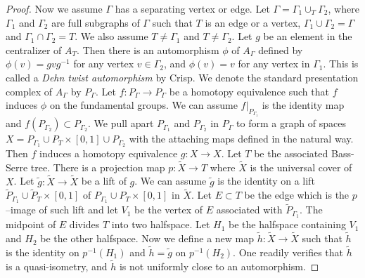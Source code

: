 \documentclass[11pt]{amsart}
\theoremstyle{definition}
\begin{document}
\begin{proof}
Now we assume $\Gamma$ has a separating vertex or edge. Let $\Gamma=\Gamma_1\cup_T\Gamma_2$, where $\Gamma_1$ and $\Gamma_2$ are full subgraphs of $\Gamma$ such that $T$ is an edge or a vertex, $\Gamma_1\cup\Gamma_2=\Gamma$ and $\Gamma_1\cap\Gamma_2=T$. We also assume $T\neq \Gamma_1$ and $T\neq\Gamma_2$. Let $g$ be an element in the centralizer of $A_T$. Then there is an automorphism $\phi$ of $A_\Gamma$ defined by $\phi(v)=gvg^{-1}$ for any vertex $v\in\Gamma_2$, and $\phi(v)=v$ for any vertex in $\Gamma_1$. This is called a \emph{Dehn twist automorphism} by Crisp. We denote the standard presentation complex of $A_\Gamma$ by $P_\Gamma$. Let $f\colon P_\Gamma\to P_\Gamma$ be a homotopy equivalence such that $f$ induces $\phi$ on the fundamental groups. We can assume $f|_{P_{\Gamma_1}}$ is the identity map and $f(P_{\Gamma_2})\subset P_{\Gamma_2}$. We pull apart $P_{\Gamma_1}$ and $P_{\Gamma_2}$ in $P_\Gamma$ to form a graph of spaces $X=P_{\Gamma_1}\cup P_T\times[0,1]\cup P_{\Gamma_2}$ with the attaching maps defined in the natural way. Then $f$ induces a homotopy equivalence $g\colon X\to X$. Let $T$ be the associated Bass-Serre tree. There is a projection map $p\colon \widetilde X\to T$ where $\widetilde X$ is the universal cover of $X$. Let $\tilde g\colon \widetilde X\to\widetilde X$ be a lift of $g$. We can assume $\tilde g$ is the identity on a lift $\widetilde P_{\Gamma_1}\cup \widetilde P_T\times[0,1]$ of $P_{\Gamma_1}\cup P_T\times[0,1]$ in $\widetilde X$. Let $E\subset T$ be the edge which is the $p$--image of such lift and let $V_1$ be the vertex of $E$ associated with $\widetilde P_{\Gamma_1}$. The midpoint of $E$ divides $T$ into two halfspace. Let $H_1$ be the halfspace containing $V_1$ and $H_2$ be the other halfspace. Now we define a new map $\tilde h\colon \widetilde X\to \widetilde X$ such that $\tilde h$ is the identity on $p^{-1}(H_1)$ and $\tilde h=\tilde g$ on $p^{-1}(H_2)$. One readily verifies that $\tilde h$ is a quasi-isometry, and $\tilde h$ is not uniformly close to an automorphism.



\end{proof}
\end{document}
